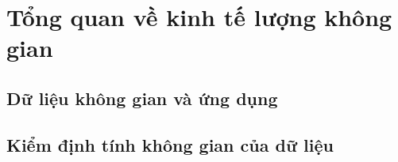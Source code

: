 \chapter{Tổng quan về kinh tế lượng không gian}
\section{Dữ liệu không gian và ứng dụng}
\section{Kiểm định tính không gian của dữ liệu}